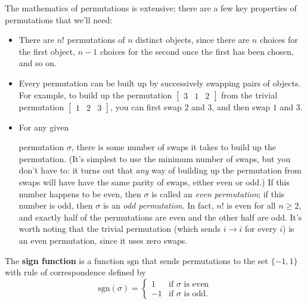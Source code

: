 The mathematics of permutations is extensive; there are a few key properties of permutations that we'll need:

\begin{itemize}
\item There are $n!$ permutations of $n$ distinct objects, since there are $n$ choices for the first object, $n-1$ choices for the second once the first has been chosen, and so on.

\item Every permutation can be built up by successively swapping pairs of objects.  For example, to build up the permutation $\begin{bmatrix} 3 & 1 & 2 \end{bmatrix}$ from the trivial permutation $\begin{bmatrix} 1 & 2 & 3 \end{bmatrix}$, you can first swap $2$ and $3$, and then swap $1$ and $3$.

\item \hypertarget{permutation_parity}{For any given} permutation $\sigma$, there is some number of swaps it takes to build up the permutation.  (It's simplest to use the minimum number of swaps, but you don't have to: it turns out that \emph{any} way of building up the permutation from swaps will have have the same parity of swaps, either even or odd.) 
If this number happens to be even, then $\sigma$ is called an \emph{even permutation}; if this number is odd, then $\sigma$ is an \emph{odd permutation}.  In fact, $n!$ is even for all $n\geq 2$, and exactly half of the permutations are even and the other half are odd.  It's worth noting that the trivial permutation (which sends $i\rightarrow i$ for every $i$) is an even permutation, since it uses zero swaps.
\end{itemize}

\begin{definition}
The {\bfseries sign function} is a function $\text{sgn}$ that sends permutations to the set $\{-1,1\}$ with rule of correspondence defined by
\[ \text{sgn}(\sigma) = 
\left\{ \begin{array}{rl}
1 & \mbox{if $\sigma$ is even}\\
-1 & \mbox{if $\sigma$ is odd}.\end{array} \right.
\]
\end{definition}


